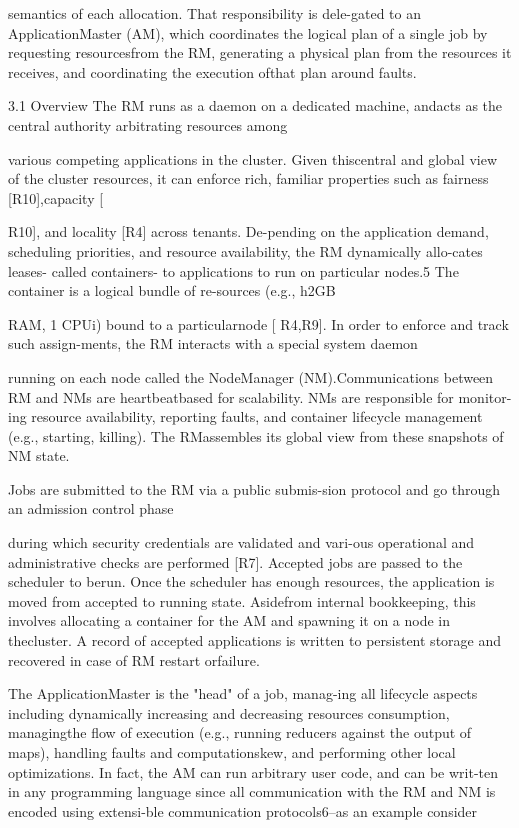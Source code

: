 semantics of each allocation. That responsibility is dele-gated to an ApplicationMaster (AM), which coordinates
the logical plan of a single job by requesting resourcesfrom the RM, generating a physical plan from the resources it receives, and coordinating the execution ofthat plan around faults.

3.1 Overview
The RM runs as a daemon on a dedicated machine, andacts as the central authority arbitrating resources among

various competing applications in the cluster. Given thiscentral and global view of the cluster resources, it can
enforce rich, familiar properties such as fairness [R10],capacity [

R10], and locality [R4] across tenants. De-pending on the application demand, scheduling priorities, and resource availability, the RM dynamically allo-cates leases- called containers- to applications to run on
particular nodes.5 The container is a logical bundle of re-sources (e.g., h2GB

RAM, 1 CPUi) bound to a particularnode [
R4,R9]. In order to enforce and track such assign-ments, the RM interacts with a special system daemon

running on each node called the NodeManager (NM).Communications between RM and NMs are heartbeatbased for scalability. NMs are responsible for monitor-ing resource availability, reporting faults, and container
lifecycle management (e.g., starting, killing). The RMassembles its global view from these snapshots of NM
state.

Jobs are submitted to the RM via a public submis-sion protocol and go through an admission control phase

during which security credentials are validated and vari-ous operational and administrative checks are performed
[R7]. Accepted jobs are passed to the scheduler to berun. Once the scheduler has enough resources, the application is moved from accepted to running state. Asidefrom internal bookkeeping, this involves allocating a
container for the AM and spawning it on a node in thecluster. A record of accepted applications is written to
persistent storage and recovered in case of RM restart orfailure.

The ApplicationMaster is the "head" of a job, manag-ing all lifecycle aspects including dynamically increasing and decreasing resources consumption, managingthe flow of execution (e.g., running reducers against
the output of maps), handling faults and computationskew, and performing other local optimizations. In fact,
the AM can run arbitrary user code, and can be writ-ten in any programming language since all communication with the RM and NM is encoded using extensi-ble communication protocols6--as an example consider


